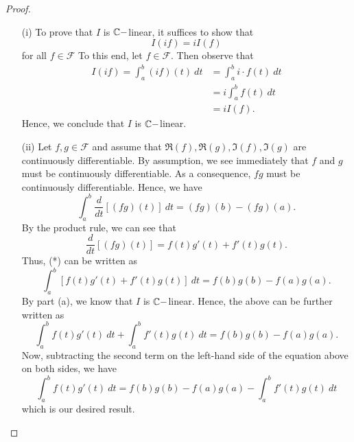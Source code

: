 \documentclass[a4paper]{article}
\begin{document}
\begin{proof}
\begin{enumerate}
    \item[(i)] To prove that \( I \) is \( \mathbb{C}- \)linear, it suffices to show that  
        \[  I(if) = i I(f) \]
        for all \( f \in \mathcal{F} \) To this end, let \( f \in \mathcal{F} \). Then observe that 
        \begin{align*}
            I(if) = \int_{ a }^{ b } (if)(t)  \ dt &= \int_{ a }^{ b }  i \cdot f(t) \ dt \\
                                                   &= i \int_{ a }^{ b } f(t) \ dt \\
                                                   &= i I(f).
        \end{align*}
        Hence, we conclude that \( I  \) is \( \mathbb{C} - \)linear.
    \item[(ii)] Let \( f,g \in \mathcal{F} \) and assume that \( \Re(f), \Re(g), \Im(f), \Im(g) \) are continuously differentiable. By assumption, we see immediately that \( f  \) and \( g  \) must be continuously differentiable. As a consequence, \( fg  \) must be continuously differentiable. Hence, we have
        \[  \int_{ a }^{ b } \frac{ d }{ dt } [ (fg)(t)] \ dt = (fg)(b) - (fg)(a). \tag{*} \]
        By the product rule, we can see that 
        \[  \frac{ d }{ dt } [(fg)(t)] = f(t)g'(t) + f'(t)g(t). \]
        Thus, (*) can be written as 
        \[  \int_{ a }^{ b } [ f(t)g'(t) + f'(t) g(t) ] \ dt = f(b)g(b) - f(a)g(a).  \]
        By part (a), we know that \( I  \) is \( \mathbb{C}- \)linear. Hence, the above can be further written as
        \[  \int_{ a }^{ b } f(t)g'(t) \ dt + \int_{ a }^{ b }  f'(t)g(t) \ dt = f(b)g(b) - f(a)g(a). \]
        Now, subtracting the second term on the left-hand side of the equation above on both sides, we have
        \[  \int_{ a }^{ b }  f(t)g'(t) \ dt = f(b)g(b) - f(a)g(a) - \int_{ a }^{ b } f'(t)g(t) \ dt \]
        which is our desired result.
\end{enumerate}
\end{proof}
\end{document}
